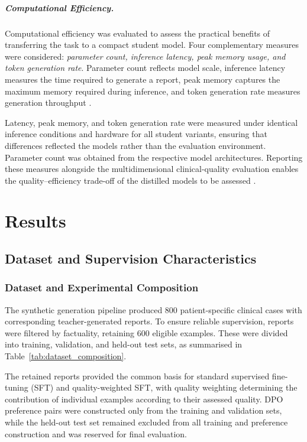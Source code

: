 \documentclass[ %
                    author={Aman Kumar Singh},
                supervisor={Dr. Edwin Simpson},
                    degree={MSc},
                     title={Quality-Aware Knowledge Distillation of Large Language Models for Efficient Personalised Clinical Report Generation},
                  subtitle={},
                      type={},
                      year={2021}]{dissertation}
\begin{document}
\paragraph{Computational Efficiency.}

Computational efficiency was evaluated to assess the practical benefits of
transferring the task to a compact student model. Four complementary
measures were considered: \textit{parameter count, inference latency, peak
memory usage, and token generation rate}. Parameter count reflects model
scale, inference latency measures the time required to generate a report,
peak memory captures the maximum memory required during inference, and
token generation rate measures generation throughput \cite{zhen_taming_2025}.

Latency, peak memory, and token generation rate were measured under
identical inference conditions and hardware for all student variants,
ensuring that differences reflected the models rather than the evaluation
environment. Parameter count was obtained from the respective model
architectures. Reporting these measures alongside the multidimensional
clinical-quality evaluation enables the quality--efficiency trade-off of
the distilled models to be assessed .


\chapter{Results}
\label{chap:evaluation}
\section{Dataset and Supervision Characteristics}
\subsection{Dataset and Experimental Composition}
\label{sec:results_dataset_composition}

The synthetic generation pipeline produced 800 patient-specific clinical
cases with corresponding teacher-generated reports. To ensure reliable
supervision, reports were filtered by factuality, retaining 600 eligible
examples. These were divided into training, validation, and held-out test
sets, as summarised in Table~\ref{tab:dataset_composition}.

The retained reports provided the common basis for standard supervised
fine-tuning (SFT) and quality-weighted SFT, with quality weighting
determining the contribution of individual examples according to their
assessed quality. DPO preference pairs were constructed only from the
training and validation sets, while the held-out test set remained excluded
from all training and preference construction and was reserved for final
evaluation.
\vspace{-15pt}
\end{document}

